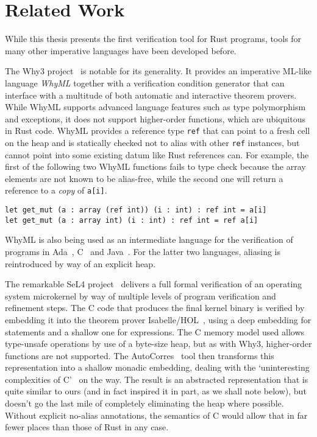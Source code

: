 \section{Related Work}

While this thesis presents the first verification tool for Rust programs, tools
for many other imperative languages have been developed before.

The Why3 project~\cite{bobot2011why3} is notable for its generality. It provides
an imperative ML-like language \emph{WhyML} together with a verification
condition generator that can interface with a multitude of both automatic and
interactive theorem provers. While WhyML supports advanced language features such
as type polymorphism and exceptions, it does not support higher-order functions,
which are ubiquitous in Rust code.
WhyML provides a reference type \texttt{ref} that can point to a fresh cell on
the heap and is statically checked not to alias with other \texttt{ref}
instances, but cannot point into some existing datum like Rust references can.
For example, the first of the following two WhyML functions fails to type check
because the array elements are not known to be alias-free, while the second one
will return a reference to a \emph{copy} of \verb!a[i]!.

\begin{verbatim}
let get_mut (a : array (ref int)) (i : int) : ref int = a[i]
let get_mut (a : array int) (i : int) : ref int = ref a[i]
\end{verbatim}

WhyML is also being used as an intermediate language for the verification of
programs in Ada~\cite{guitton2011hi}, C~\cite{cuoq2012frama} and Java~\cite{filliatre2007krakatoa}.
For the latter two languages, aliasing is reintroduced by way of an explicit heap.

The remarkable SeL4 project~\cite{klein2009sel4} delivers a full formal verification of an operating
system microkernel by way of multiple levels of program verification and
refinement steps. The C code that produces the final kernel binary is verified
by embedding it into the theorem prover
Isabelle/HOL~\cite{nipkow2002isabelle}, using a deep embedding for statements
and a shallow one for expressions. The C memory model used allows type-unsafe
operations by use of a byte-size heap, but as with Why3, higher-order functions are
not supported. The AutoCorres~\cite{greenaway2012bridging, greenaway2014don}
tool then transforms this representation into a shallow monadic embedding,
dealing with the `uninteresting complexities of C'~\cite{greenaway2014don} on the
way. The result is an abstracted representation that is quite similar to ours
(and in fact inspired it in part, as we shall note below), but doesn't go the
last mile of completely eliminating the heap where possible. Without explicit
no-alias annotations, the semantics of C would allow that in far fewer places than those
of Rust in any case.

